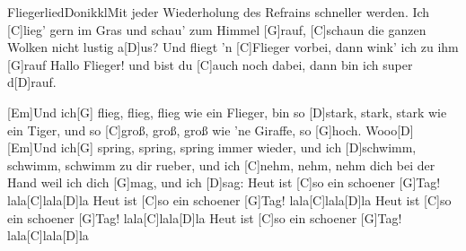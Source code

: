 \documentclass[../main.tex]{subfiles}
\begin{document}
\begin{songwithoutpagebreak}[2]{Fliegerlied}{Donikkl}{Mit jeder Wiederholung des Refrains schneller werden.}
Ich [C]lieg' gern im Gras und schau' zum Himmel [G]rauf,
[C]schaun die ganzen Wolken nicht lustig a[D]us?
Und fliegt 'n [C]Flieger vorbei, dann wink' ich zu ihm [G]rauf     Hallo Flieger!
und bist du [C]auch noch dabei, dann bin ich super d[D]rauf.

[Em]Und ich[G] flieg, flieg, flieg wie ein Flieger,
bin so [D]stark, stark, stark wie ein Tiger,
und so [C]groß, groß, groß wie 'ne Giraffe, so [G]hoch. Wooo[D]
[Em]Und ich[G] spring, spring, spring immer wieder,
und ich [D]schwimm, schwimm, schwimm zu dir rueber,
und ich [C]nehm, nehm, nehm dich bei der Hand weil ich dich [G]mag, und ich [D]sag:
Heut ist [C]so ein schoener [G]Tag! lala[C]lala[D]la
Heut ist [C]so ein schoener [G]Tag! lala[C]lala[D]la
Heut ist [C]so ein schoener [G]Tag! lala[C]lala[D]la
Heut ist [C]so ein schoener [G]Tag! lala[C]lala[D]la
\end{songwithoutpagebreak}
\end{document}
